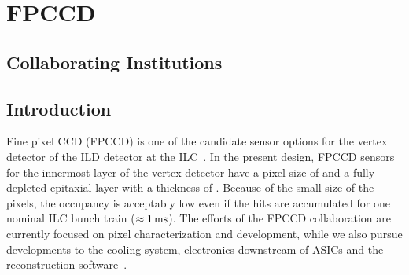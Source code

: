 \section{FPCCD}
\subsection{Collaborating Institutions}
\subsection{Introduction}
    Fine pixel CCD (FPCCD) is one of the candidate sensor options for the vertex detector of the ILD detector at the ILC~\cite{Sugimoto:2005ru,2009arXiv0902.2067S,2012arXiv1202.5832S}. In the present design, FPCCD sensors for the innermost layer of the vertex detector have a pixel size of \unit[5]{\micron} and a fully depleted epitaxial layer with a thickness of \unit[15]{\micron}. Because of the small size of the pixels, the occupancy is acceptably low even if the hits are accumulated for one nominal ILC bunch train ($\approx\unit[1]{ms}$).
    The efforts of the FPCCD collaboration are currently focused on pixel characterization and development, while we also pursue developments to the cooling system, electronics downstream of ASICs and the reconstruction software~\cite{Mori:2014xta}.

